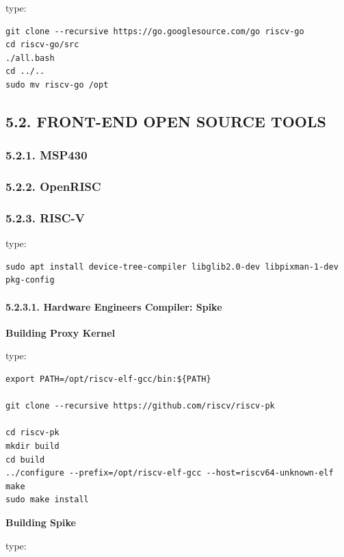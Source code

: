 \documentclass[]{article}
\let\oldparagraph\paragraph
\renewcommand{\paragraph}[1]{\oldparagraph{#1}\mbox{}}
\begin{document}
type:

\begin{verbatim}
git clone --recursive https://go.googlesource.com/go riscv-go
cd riscv-go/src
./all.bash
cd ../..
sudo mv riscv-go /opt
\end{verbatim}

\subsection{5.2. FRONT-END OPEN SOURCE
TOOLS}\label{front-end-open-source-tools-1}

\subsubsection{5.2.1. MSP430}\label{msp430-1}

\subsubsection{5.2.2. OpenRISC}\label{openrisc-1}

\subsubsection{5.2.3. RISC-V}\label{risc-v-1}

type:

\begin{verbatim}
sudo apt install device-tree-compiler libglib2.0-dev libpixman-1-dev pkg-config
\end{verbatim}

\paragraph{5.2.3.1. Hardware Engineers Compiler:
Spike}\label{hardware-engineers-compiler-spike}

\textbf{Building Proxy Kernel}

type:

\begin{verbatim}
export PATH=/opt/riscv-elf-gcc/bin:${PATH}

git clone --recursive https://github.com/riscv/riscv-pk

cd riscv-pk
mkdir build
cd build
../configure --prefix=/opt/riscv-elf-gcc --host=riscv64-unknown-elf
make
sudo make install
\end{verbatim}

\textbf{Building Spike}

type:
\end{document}
